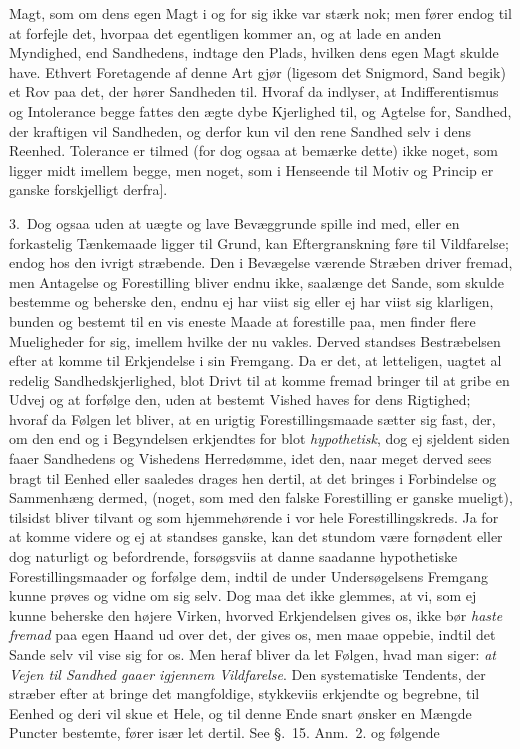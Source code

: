 \documentclass[12pt,a4paper]{book}
\newcommand{\apage}[1]{\marginnote{\footnotesize\textit{[#1]}}}
\begin{document}
Magt, som om dens egen Magt i og for sig ikke var stærk nok; men fører endog til
at forfejle det, hvorpaa det egentligen kommer an, og at lade en anden Myndighed,
end Sandhedens, indtage den Plads, hvilken dens egen Magt skulde have. Ethvert
Foretagende af denne Art gjør (ligesom det Snigmord,%
 Sand begik) et Rov paa det, der hører Sandheden til. Hvoraf da indlyser, at
Indifferentismus og Intolerance begge fattes den ægte dybe Kjerlighed til, og
Agtelse for, Sandhed, der kraftigen vil Sandheden, og derfor kun vil den rene
Sandhed selv i dens Reenhed. Tolerance er tilmed (for dog ogsaa at bemærke dette)
ikke noget, som ligger midt imellem begge, men noget, som i Henseende til Motiv og
Princip er ganske forskjelligt derfra].

3.~Dog ogsaa uden at uægte og lave Bevæggrunde spille ind med, eller en
forkastelig Tænkemaade ligger til Grund, kan Eftergranskning føre til Vildfarelse;
endog hos den ivrigt stræbende. Den i Bevægelse værende Stræben driver fremad, \apage{180} men
Antagelse og Forestilling bliver endnu ikke, saalænge det Sande, som skulde
bestemme og beherske den, endnu ej har viist sig eller ej har viist sig
klarligen, bunden og bestemt til en vis eneste Maade at forestille paa, men finder
flere Mueligheder for sig, imellem hvilke der nu vakles. Derved standses
Bestræbelsen efter at komme til Erkjendelse i sin Fremgang. Da er det, at
letteligen, uagtet al redelig Sandhedskjerlighed, blot Drivt til at komme fremad
bringer til at gribe en Udvej og at forfølge den, uden at bestemt Vished haves for
dens Rigtighed; hvoraf da Følgen let bliver, at en urigtig Forestillingsmaade
sætter sig fast, der, om den end og i Begyndelsen erkjendtes for blot
\emph{hypothetisk}, dog ej sjeldent siden faaer Sandhedens og Vishedens
Herredømme, idet den, naar meget derved sees bragt til Eenhed eller saaledes
drages hen dertil, at det bringes i Forbindelse og Sammenhæng dermed, (noget, som
med den falske Forestilling er ganske mueligt), tilsidst bliver tilvant og som
hjemmehørende i vor hele Forestillingskreds. Ja for at komme videre og ej at
standses ganske, kan det stundom være fornødent eller dog naturligt og
befordrende, forsøgsviis at danne saadanne hypothetiske Forestillingsmaader og
forfølge dem, indtil de under Undersøgelsens Fremgang kunne prøves og vidne om sig
selv. Dog maa det ikke glemmes, at vi, som ej  \apage{181} kunne beherske den højere Virken,
hvorved Erkjendelsen gives os, ikke bør \emph{haste fremad} paa egen Haand ud over det,
der gives os, men maae oppebie, indtil det Sande selv vil vise sig for os. Men
heraf bliver da let Følgen, hvad man siger: \emph{at Vejen til Sandhed gaaer
igjennem Vildfarelse}. Den systematiske Tendents, der stræber efter at bringe det
mangfoldige, stykkeviis erkjendte og begrebne, til Eenhed og deri vil skue et
Hele, og til denne Ende snart ønsker en Mængde Puncter bestemte, fører især let
dertil. See §.~15. Anm.~2. og følgende
\end{document}
